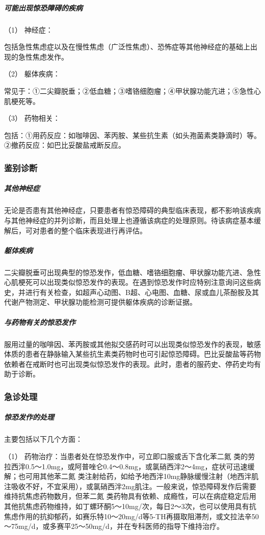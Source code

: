\subparagraph{可能出现惊恐障碍的疾病}

\hypertarget{text00051.htmlux5cux23CHP1-18-9-1-3-1}{}
（1） 神经症：

包括急性焦虑症以及在慢性焦虑（广泛性焦虑）、恐怖症等其他神经症的基础上出现的急性焦虑发作。

\hypertarget{text00051.htmlux5cux23CHP1-18-9-1-3-2}{}
（2） 躯体疾病：

常见于：①二尖瓣脱垂；②低血糖；③嗜铬细胞瘤；④甲状腺功能亢进；⑤急性心肌梗死等。

\hypertarget{text00051.htmlux5cux23CHP1-18-9-1-3-3}{}
（3） 药物相关：

包括：①用药反应：如咖啡因、苯丙胺、某些抗生素（如头孢菌素类静滴时）等。②撤药反应：如巴比妥酸盐戒断反应。

\subsubsection{鉴别诊断}

\subparagraph{其他神经症}

无论是否患有其他神经症，只要患者有惊恐障碍的典型临床表现，都不影响该疾病与其他神经症的并列诊断，而且处理上也遵循该病症的处理原则。待该病症基本缓解后，可对患者的整个临床表现进行再评估。

\subparagraph{躯体疾病}

二尖瓣脱垂可出现典型的惊恐发作，低血糖、嗜铬细胞瘤、甲状腺功能亢进、急性心肌梗死可以出现类似惊恐发作的表现。在遇到惊恐发作时应特别注意询问这些病史，并进行有关检查，如超声心动图、B超、心电图、血糖、尿或血儿茶酚胺及其代谢产物测定、甲状腺功能检测可提供躯体疾病的诊断证据。

\subparagraph{与药物有关的惊恐发作}

服用过量的咖啡因、苯丙胺或其他拟交感药时可以出现类似惊恐发作的表现，敏感体质的患者在静脉输入某些抗生素类药物时也可引起惊恐障碍。巴比妥酸盐等药物依赖者在戒断时也可出现类似惊恐发作的表现。此时，患者的服药史、停药史均有助于诊断。

\subsubsection{急诊处理}

\subparagraph{惊恐发作的处理}

主要包括以下几个方面：

（1） 药物治疗：当患者处在惊恐发作中，可立即口服或舌下含化苯二氮{}
类的劳拉西泮0.5～1.0mg，或阿普唑仑0.4～0.8mg，或氯硝西泮2～4mg，症状可迅速缓解；也可用其他苯二氮{}
类注射给药，如给予地西泮10mg静脉缓慢注射（地西泮肌注吸收不好，不宜采用），或氯硝西泮2mg肌注。一般来说，惊恐障碍发作后需要维持抗焦虑药物数月，但苯二氮{}
类药物具有依赖、成瘾性，可以在病症稳定后用其他抗焦虑药物维持，如丁螺环酮5～10mg/次，每日2～3次，也可以使用具有抗焦虑作用的抗抑郁药，如赛乐特10～20mg/d等5-TH再摄取阻滞剂，或文拉法辛50～75mg/d，或多赛平25～50mg/d，并在专科医师的指导下维持治疗。

